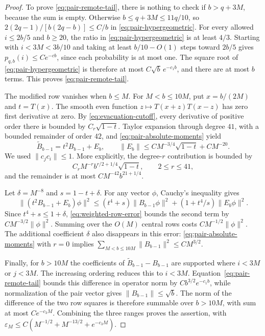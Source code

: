 \begin{proof}
To prove \eqref{eq:pair-remote-tail}, there is nothing to check if
$b>q+3M$, because the sum is empty.  Otherwise $b\le q+3M\le11q/10$,
so $2(2q-1)/[b(2q-b)]\le C/b$ in
\eqref{eq:pair-hypergeometric}.
For every allowed $i\le2b/5$ and $b\ge20$, the ratio in
\eqref{eq:pair-hypergeometric} is at least $4/3$.
Starting with $i<3M<3b/10$ and taking at least $b/10-O(1)$ steps toward
$2b/5$ gives $p_{q,b}(i)\le Ce^{-c b}$, since each probability is at most
one.  The square root of \eqref{eq:pair-hypergeometric} is therefore at
most $C\sqrt b\,e^{-c_1b}$, and there are at most $b$ terms.  This proves
\eqref{eq:pair-remote-tail}.

The modified row vanishes when $b\le M$.  For $M<b\le10M$, put
$x=b/(2M)$ and $t=T(x)$.  The smooth even function
$z\mapsto T(x+z)T(x-z)$ has zero first derivative at zero.  By
\eqref{eq:evacuation-cutoff}, every derivative of positive order there is
bounded by $C_r\sqrt{1-t}$.  Taylor expansion through degree $41$, with a
bounded remainder of order $42$, and
\eqref{eq:pair-absolute-moments} yield
\begin{equation}\label{eq:weighted-row-error}
 \widetilde B_{b-1}=t^2 B_{b-1}+E_b,
 \qquad
 \|E_b\|\le CM^{-3/4}\sqrt{1-t}+CM^{-20}.
\end{equation}
We used $\|c_jc_i\|\le1$.  More explicitly, the degree-$r$ contribution
is bounded by
\[
 C_rM^{-r}b^{r/2+1/4}\sqrt{1-t},\qquad 2\le r\le41,
\]
and the remainder is at most $CM^{-42}b^{21+1/4}$.

Let $\delta=M^{-8}$ and $s=1-t+\delta$.  For any vector $\phi$, Cauchy's
inequality gives
\[
 \|(t^2B_{b-1}+E_b)\phi\|^2
 \le(t^4+s)\|B_{b-1}\phi\|^2
       +(1+t^4/s)\|E_b\phi\|^2.
\]
Since $t^4+s\le1+\delta$, \eqref{eq:weighted-row-error} bounds the second
term by $CM^{-3/2}\|\phi\|^2$.  Summing over the $O(M)$ central rows
costs $CM^{-1/2}\|\phi\|^2$.
The additional coefficient $\delta$ also disappears in this error:
\eqref{eq:pair-absolute-moments} with $r=0$ implies
$\sum_{M<b\le10M}\|B_{b-1}\|^2\le CM^{3/2}$.

Finally, for $b>10M$ the coefficients of
$\widetilde B_{b-1}-B_{b-1}$ are supported where $i<3M$ or $j<3M$.
The increasing ordering reduces this to $i<3M$.
Equation~\eqref{eq:pair-remote-tail} bounds this difference in operator
norm by $Cb^{3/2}e^{-c_1b}$, while normalization of the pair vector gives
$\|B_{b-1}\|\le\sqrt b$.  The norm of the difference of the two row
squares is therefore summable over $b>10M$, with sum at most
$Ce^{-c_3M}$.  Combining the three ranges proves the assertion, with
$\varepsilon_M\le C(M^{-1/2}+M^{-13/2}+e^{-c_3M})$.
\end{proof}

